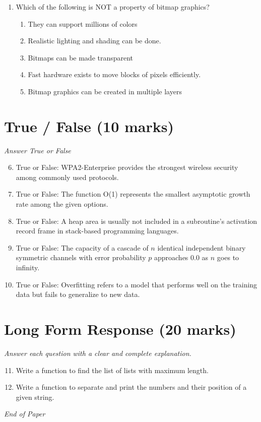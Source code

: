 \documentclass[12pt]{article}
\begin{document}
\begin{enumerate}[label=\arabic*.]
\begin{enumerate}[label=(\alph*)]
    \item Cannot be determined from the given data
    \item Brightness is subjective and cannot be determined from HSI values alone
    \item (b) is brighter because it has a higher saturation and lower hue value
\end{enumerate}
\item Which of the following is NOT a property of bitmap graphics?
\begin{enumerate}[label=(\alph*)]
    \item They can support millions of colors
    \item Realistic lighting and shading can be done.
    \item Bitmaps can be made transparent
    \item Fast hardware exists to move blocks of pixels efficiently.
    \item Bitmap graphics can be created in multiple layers
\end{enumerate}
\end{enumerate}

\section*{True / False (10 marks)}
\textit{Answer True or False}
\begin{enumerate}[label=\arabic*.]
\setcounter{enumi}{5}
\item True or False: WPA2-Enterprise provides the strongest wireless security among commonly used protocols.
\item True or False: The function O(1) represents the smallest asymptotic growth rate among the given options.
\item True or False: A heap area is usually not included in a subroutine's activation record frame in stack-based programming languages.
\item True or False: The capacity of a cascade of $n$ identical independent binary symmetric channels with error probability $p$ approaches 0.0 as $n$ goes to infinity.
\item True or False: Overfitting refers to a model that performs well on the training data but fails to generalize to new data.
\end{enumerate}

\section*{Long Form Response (20 marks)}
\textit{Answer each question with a clear and complete explanation.}
\begin{enumerate}[label=\arabic*.]
\setcounter{enumi}{10}
\item Write a function to find the list of lists with maximum length.
\item Write a function to separate and print the numbers and their position of a given string.
\end{enumerate}

\vfill
\noindent\textit{End of Paper}
\end{document}
